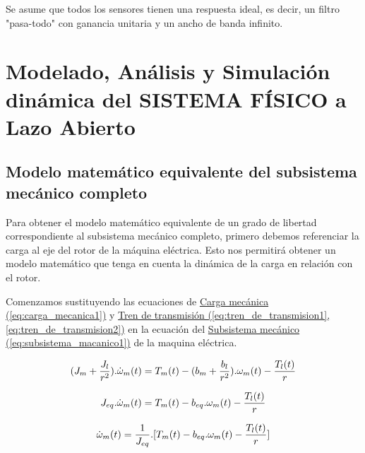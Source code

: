 \documentclass{article}
\begin{document}
Se asume que todos los sensores tienen una respuesta ideal, es decir, un filtro "pasa-todo" con ganancia 
unitaria y un ancho de banda infinito.


\section{Modelado, Análisis y Simulación dinámica del SISTEMA FÍSICO a Lazo Abierto}


\subsection{Modelo matemático equivalente del subsistema mecánico completo}

Para obtener el modelo matemático equivalente de un grado de libertad correspondiente al subsistema 
mecánico completo, primero debemos referenciar la carga al eje del rotor de la máquina eléctrica. Esto 
nos permitirá obtener un modelo matemático que tenga en cuenta la dinámica de la carga en relación con 
el rotor.

Comenzamos sustituyendo las ecuaciones de
\hyperref[eq:carga_mecanica1]{Carga mecánica (\ref*{eq:carga_mecanica1})} y 
\hyperref[eq:tren_de_transmision1, eq:tren_de_transmision2]{Tren de transmisión (\ref*{eq:tren_de_transmision1}, \ref*{eq:tren_de_transmision2})} 
en la ecuación del
\hyperref[eq:subsistema_macanico1]{Subsistema mecánico (\ref*{eq:subsistema_macanico1})} de la maquina eléctrica.

\begin{equation}
    \label{eq:4.1}
    (J_{m}+\frac{J_l}{r^2}).\dot{\omega}_{m}(t) = T_{m}(t)-(b_{m}+\frac{b_{l}}{r^2}).\omega_{m}(t)-\frac{T_{l}(t)}{r} \\
\end{equation}

\begin{equation}
    J_{eq}.\dot{\omega}_{m}(t) = T_{m}(t)-b_{eq}.\omega_{m}(t)-\frac{T_{l}(t)}{r} \\
\end{equation}

\begin{equation}
    \dot{\omega}_{m}(t) = \frac{1}{J_{eq}}.[T_{m}(t) - b_{eq}.\omega_{m}(t) - \frac{T_{l}(t)}{r}]\\
\end{equation}
\end{document}
